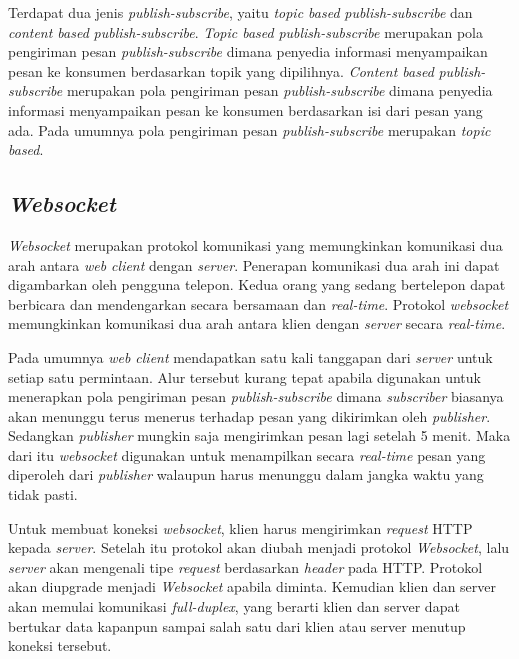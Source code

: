 Terdapat dua jenis \textit{publish-subscribe}, yaitu \textit{topic based} \textit{publish-subscribe} dan \textit{content based} \textit{publish-subscribe}. \textit{Topic based} \textit{publish-subscribe} merupakan pola pengiriman pesan \textit{publish-subscribe} dimana penyedia informasi menyampaikan pesan ke konsumen berdasarkan topik yang dipilihnya. \textit{Content based} \textit{publish-subscribe} merupakan pola pengiriman pesan \textit{publish-subscribe} dimana penyedia informasi menyampaikan pesan ke konsumen berdasarkan isi dari pesan yang ada. Pada umumnya pola pengiriman pesan \textit{publish-subscribe} merupakan \textit{topic based}.


\subsection{\textit{Websocket}}
\textit{Websocket} merupakan protokol komunikasi yang memungkinkan komunikasi dua arah antara \textit{web client} dengan \textit{server}. Penerapan komunikasi dua arah ini dapat digambarkan oleh pengguna telepon. Kedua orang yang sedang bertelepon dapat berbicara dan mendengarkan secara bersamaan dan \textit{real-time}. Protokol \textit{websocket} memungkinkan komunikasi dua arah antara klien dengan \textit{server} secara \textit{real-time}.

Pada umumnya \textit{web client} mendapatkan satu kali tanggapan dari \textit{server} untuk setiap satu permintaan. Alur tersebut kurang tepat apabila digunakan untuk menerapkan pola pengiriman pesan \textit{publish-subscribe} dimana \textit{subscriber} biasanya akan menunggu terus menerus terhadap pesan yang dikirimkan oleh \textit{publisher}. Sedangkan \textit{publisher} mungkin saja mengirimkan pesan lagi setelah 5 menit. Maka dari itu \textit{websocket} digunakan untuk menampilkan secara \textit{real-time} pesan yang diperoleh dari \textit{publisher} walaupun harus menunggu dalam jangka waktu yang tidak pasti.

Untuk membuat koneksi \textit{websocket}, klien harus mengirimkan \textit{request} HTTP kepada \textit{server}. Setelah itu protokol akan diubah menjadi protokol \textit{Websocket}, lalu \textit{server} akan mengenali tipe \textit{request} berdasarkan \textit{header} pada HTTP. Protokol akan diupgrade menjadi \textit{Websocket} apabila diminta. Kemudian klien dan server akan memulai komunikasi \textit{full-duplex}, yang berarti klien dan server dapat bertukar data kapanpun sampai salah satu dari klien atau server menutup koneksi tersebut.


